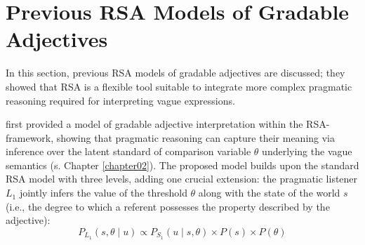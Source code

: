 
\section{Previous RSA Models of Gradable Adjectives}
In this section, previous RSA models of gradable adjectives are discussed; they showed that RSA is a flexible tool suitable to integrate more complex pragmatic reasoning required for interpreting vague expressions.

\textcite{lassiter2013context} first provided a model of gradable adjective interpretation within the RSA-framework, showing that pragmatic reasoning can capture their meaning via inference over the latent standard of comparison variable $\theta$ underlying the vague semantics (s. Chapter \ref{chapter02}). %
The proposed model builds upon the standard RSA model with three levels, adding one crucial extension: the pragmatic listener $L_1$ jointly infers the value of the threshold $\theta$ along with the state of the world $s$ (i.e., the degree to which a referent possesses the property described by the adjective):
\begin{equation}
P_{L_1} (s, \theta \mid u) \propto P_{S_1} (u \mid s, \theta) \times P (s) \times P(\theta)
\end{equation} 

